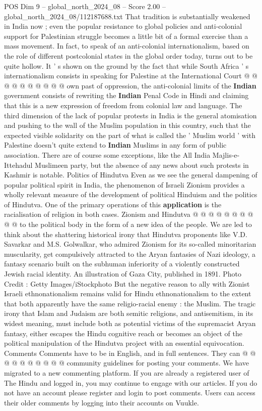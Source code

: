 \begin{textsample}{POS Dim 9 – global\_north\_2024\_08 – Score 2.00 – global\_north\_2024\_08/112187688.txt}
That tradition is substantially weakened in India now ; even the popular resistance to global policies and anti-colonial support for Palestinian struggle becomes a little bit of a formal exercise than a mass movement.
In fact, to speak of an anti-colonial internationalism, based on the role of different postcolonial states in the global order today, turns out to be quite hollow.
It ' s shown on the ground by the fact that while South Africa ' s internationalism consists in speaking for Palestine at the International Court @ @ @ @ @ @ @ @ @ @ own past of oppression, the anti-colonial limits of the \textbf{Indian} government consists of rewriting the \textbf{Indian} Penal Code in Hindi and claiming that this is a new expression of freedom from colonial law and language.
The third dimension of the lack of popular protests in India is the general atomisation and pushing to the wall of the Muslim population in this country, such that the expected visible solidarity on the part of what is called the ' Muslim world ' with Palestine doesn't quite extend to \textbf{Indian} Muslims in any form of public association.
There are of course some exceptions, like the All India Majlis-e-Ittehadul Muslimeen party, but the absence of any news about such protests in Kashmir is notable.
Politics of Hindutva Even as we see the general dampening of popular political spirit in India, the phenomenon of Israeli Zionism provides a wholly relevant measure of the development of political Hinduism and the politics of Hindutva.
One of the primary operations of this \textbf{application} is the racialisation of religion in both cases.
Zionism and Hindutva @ @ @ @ @ @ @ @ @ @ to the political body in the form of a new idea of the people.
We are led to think about the shattering historical irony that Hindutva proponents like V.D.
Savarkar and M.S.
Golwalkar, who admired Zionism for its so-called minoritarian muscularity, get compulsively attracted to the Aryan fantasies of Nazi ideology, a fantasy scenario built on the subhuman inferiority of a violently constructed Jewish racial identity.
An illustration of Gaza City, published in 1891.
Photo Credit : Getty Images/iStockphoto But the negative reason to ally with Zionist Israeli ethnonationalism remains valid for Hindu ethnonationalism to the extent that both apparently have the same religio-racial enemy : the Muslim.
The tragic irony that Islam and Judaism are both semitic religions, and antisemitism, in its widest meaning, must include both as potential victims of the supremacist Aryan fantasy, either escapes the Hindu cognitive reach or becomes an object of the political manipulation of the Hindutva project with an essential equivocation.
Comments Comments have to be in English, and in full sentences.
They can @ @ @ @ @ @ @ @ @ @ community guidelines for posting your comments.
We have migrated to a new commenting platform.
If you are already a registered user of The Hindu and logged in, you may continue to engage with our articles.
If you do not have an account please register and login to post comments.
Users can access their older comments by logging into their accounts on Vuukle.

\end{textsample}

